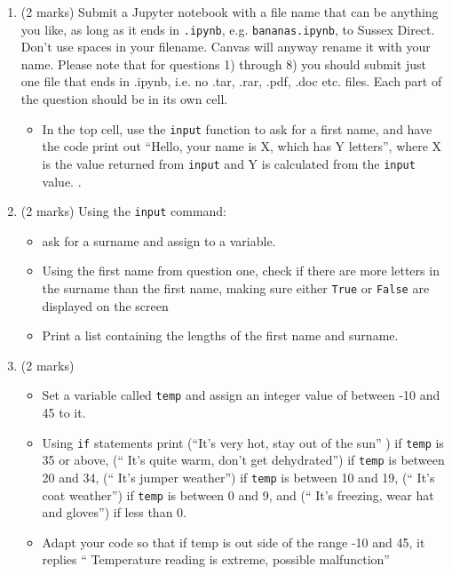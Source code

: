 \begin{enumerate}
    \item (2 marks) Submit a Jupyter notebook with a file name that can be anything you like, as long as it ends in  {\tt .ipynb}, e.g. {\tt bananas.ipynb}, to Sussex Direct. Don't use spaces in your filename. Canvas will anyway rename it with your name. Please note that for questions 1) through 8) you should submit just one file that ends in .ipynb, i.e. no .tar, .rar, .pdf, .doc etc. files. Each part of the question should be in its own cell. \\
    \begin{itemize}
        \item In the top cell, use the {\tt input} function to ask for a first name, and have the code print out ``Hello, your name is X, which has Y letters'', where X is the value returned from {\tt input} and Y is calculated from the {\tt input} value. {\it }.
    \end{itemize}

    \item (2 marks) Using the {\tt input} command: 
    \begin{itemize}
        \item ask for a surname and assign to a variable. 
        \item Using the first name from question one, check if there are more letters in the surname than the first name, making sure either {\tt True} or {\tt False} are displayed on the screen
        \item Print a list containing the lengths of the first name and surname.
    \end{itemize}
    
    \item (2 marks) 
    \begin{itemize}
        \item Set a variable called {\tt temp} and assign an integer value of between -10 and 45 to it.
        \item Using {\tt if} statements print (``It's very hot, stay out of the sun'' ) if {\tt temp} is 35 or above, (`` It's quite warm, don't get dehydrated'') if {\tt temp} is between 20 and 34, (`` It's jumper weather'') if {\tt temp} is between 10 and 19, (`` It's coat weather'') if {\tt temp} is between 0 and 9, and (`` It's freezing, wear hat and gloves'') if less than 0.
        \item Adapt your code so that if temp is out side of the range -10 and 45, it replies `` Temperature reading is extreme, possible malfunction''
    \end{itemize}
    

\end{enumerate}
